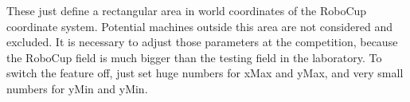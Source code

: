 These just define a rectangular area in world coordinates of the RoboCup coordinate system. Potential machines outside this area are not considered and excluded.
It is necessary to adjust those parameters at the competition, because the RoboCup field is much bigger than the testing field in the laboratory.
To switch the feature off, just set huge numbers for xMax and yMax, and very small numbers for yMin and yMin.







